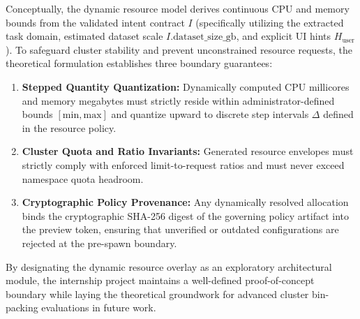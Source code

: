 Conceptually, the dynamic resource model derives continuous CPU and memory bounds from the validated intent contract $I$ (specifically utilizing the extracted task domain, estimated dataset scale $I.\mathrm{dataset\_size\_gb}$, and explicit UI hints $H_{\mathrm{user}}$). To safeguard cluster stability and prevent unconstrained resource requests, the theoretical formulation establishes three boundary guarantees:
\begin{enumerate}
    \item \textbf{Stepped Quantity Quantization:} Dynamically computed CPU millicores and memory megabytes must strictly reside within administrator-defined bounds $[\mathrm{min}, \mathrm{max}]$ and quantize upward to discrete step intervals $\Delta$ defined in the resource policy.
    \item \textbf{Cluster Quota and Ratio Invariants:} Generated resource envelopes must strictly comply with enforced limit-to-request ratios and must never exceed namespace quota headroom.
    \item \textbf{Cryptographic Policy Provenance:} Any dynamically resolved allocation binds the cryptographic SHA-256 digest of the governing policy artifact into the preview token, ensuring that unverified or outdated configurations are rejected at the pre-spawn boundary.
\end{enumerate}
By designating the dynamic resource overlay as an exploratory architectural module, the internship project maintains a well-defined proof-of-concept boundary while laying the theoretical groundwork for advanced cluster bin-packing evaluations in future work.